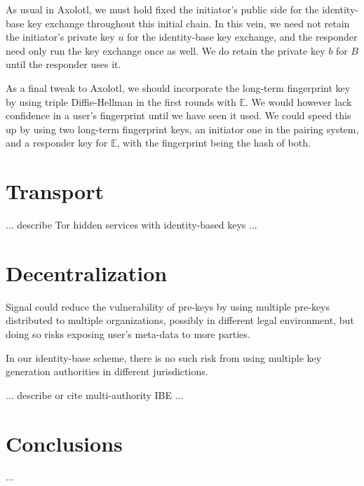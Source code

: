 \documentclass[twoside,letterpaper]{sig-alternate}
\begin{document}
As usual in Axolotl, we must hold fixed the initiator's public side
 for the identity-base key exchange throughout this initial chain.
In this vein, we need not retain the initiator's private key $u$ for
 the identity-base key exchange, and
 the responder need only run the key exchange once as well.
We do retain the private key $b$ for $B$ until the responder uses it.

As a final tweak to Axolotl, we should incorporate
the long-term fingerprint key by using triple Diffie-Hellman
in the first rounds with $\mathbb{E}$.
We would however lack confidence in a user's fingerprint until
we have seen it used.
We could speed this up by using two long-term fingerprint keys,
an initiator one in the pairing system, and
 a responder key for $\mathbb{E}$,
with the fingerprint being the hash of both.

\section{Transport}

... describe Tor hidden services with identity-based keys ...

\section{Decentralization}

Signal could reduce the vulnerability of pre-keys by using
multiple pre-keys distributed to multiple organizations,
 possibly in different legal environment, but
doing so risks exposing user's meta-data to more parties.

In our identity-base scheme, there is no such risk from using
multiple key generation authorities in different jurisdictions.

... describe or cite multi-authority IBE ...

\section{Conclusions}

...







\end{document}
